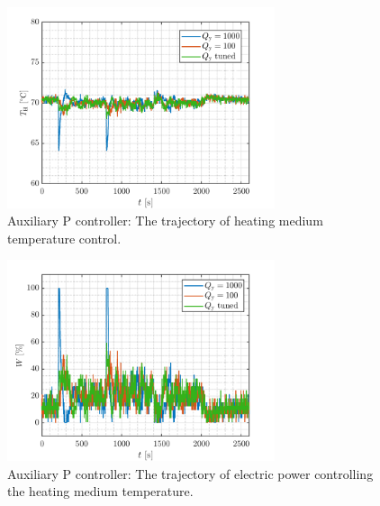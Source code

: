 \documentclass[a4paper,10pt]{article}
\begin{document}
{		\begin{figure}
			\begin{center}
				\includegraphics[width=0.7\textwidth]{images/Th}
				\caption{Auxiliary P controller: The trajectory of heating medium temperature control.}
				\label{fig:Th}
			\end{center}
		\end{figure}
	
		\begin{figure}
			\begin{center}
				\includegraphics[width=0.7\textwidth]{images/W}
				\caption{Auxiliary P controller: The trajectory of electric power controlling the heating medium temperature.}
				\label{fig:W}
			\end{center}
		\end{figure}	

	}
	
	
	
	
	
\end{document}

